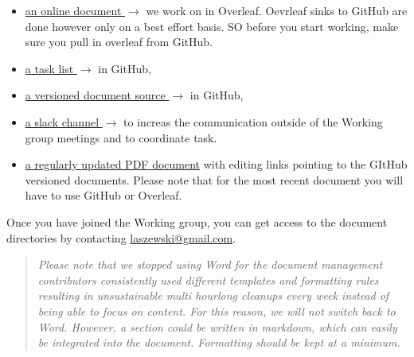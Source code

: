 \begin{itemize}

\item
  \href{https://www.overleaf.com/project/619ba513e4aade4400e06df8}{an
    online document $\rightarrow$} we work on in Overleaf. Oevrleaf
  sinks to GitHub are done however only on a best effort basis. SO
  before you start working, make sure you pull in overleaf from
  GitHub.

\item \href{https://github.com/orgs/cyberaide/projects/1}{a task list
  $\rightarrow$} in GitHub,

\item \href{https://github.com/orgs/cyberaide/}{a versioned document
  source $\rightarrow$} in GitHub,

\item \href{https://nist-analytics.slack.com}{a slack channel
  $\rightarrow$} to increas the communication outside of the Working
  group meetings and to coordinate task.

\item
  \href{https://github.com/cyberaide/NIST-analytics/raw/main/NIST-analytics.pdf}{a
    regularly updated PDF document} with editing links pointing to the
  GItHub versioned documents. Please note that for the most recent
  document you will have to use GitHub or Overleaf. 
  
\end{itemize}

Once you have joined the Working group, you can get access to the
document directories by contacting \url{laszewski@gmail.com}.

\begin{quote}

{\em Please note that we stopped using Word for the document
  management contributors consistently used different templates and
  formatting rules resulting in unsustainable multi hourlong cleanups
  every week instead of being able to focus on content. For this
  reason, we will not switch back to Word. However, a section could be
  written in markdown, which can easily be integrated into the
  document. Formatting should be kept at a minimum.}

\end{quote}
